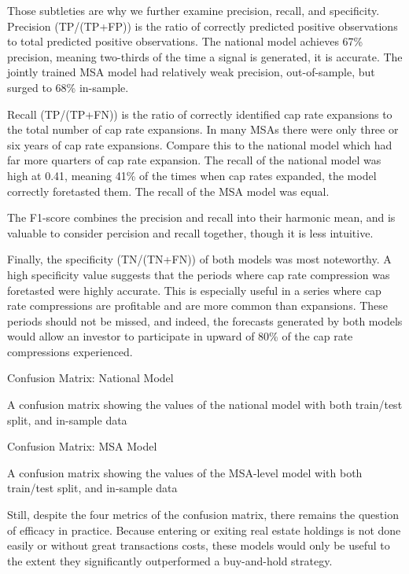 Those subtleties are why we further examine precision, recall, and specificity. Precision (TP/(TP+FP)) is the ratio of correctly predicted positive observations to total predicted positive observations. The national model achieves 67\% precision, meaning two-thirds of the time a signal is generated, it is accurate. The jointly trained MSA model had relatively weak precision, out-of-sample, but surged to 68\% in-sample. 

Recall (TP/(TP+FN)) is the ratio of correctly identified cap rate expansions to the total number of cap rate expansions. In many MSAs there were only three or six years of cap rate expansions. Compare this to the national model which had far more quarters of cap rate expansion. The recall of the national model was high at 0.41, meaning 41\% of the times when cap rates expanded, the model correctly foretasted them. The recall of the MSA model was equal.

The F1-score combines the precision and recall into their harmonic mean, and is valuable to consider percision and recall together, though it is less intuitive. 

Finally, the specificity (TN/(TN+FN)) of both models was most noteworthy. A high specificity value suggests that the periods where cap rate compression was foretasted were highly accurate. This is especially useful in a series where cap rate compressions are profitable and are more common than expansions. These periods should not be missed, and indeed, the forecasts generated by both models would allow an investor to participate in upward of 80\% of the cap rate compressions experienced.



\begin{table}[H]
\centering
\caption*{Confusion Matrix: National Model}
\caption{A confusion matrix showing the values of the national model with both train/test split, and in-sample data}
\end{table}

\begin{table}[H]
\centering
\caption*{Confusion Matrix: MSA Model}
\caption{A confusion matrix showing the values of the MSA-level model with both train/test split, and in-sample data}
\end{table}

Still, despite the four metrics of the confusion matrix, there remains the question of efficacy in practice. Because entering or exiting real estate holdings is not done easily or without great transactions costs, these models would only be useful to the extent they significantly outperformed a buy-and-hold strategy.

